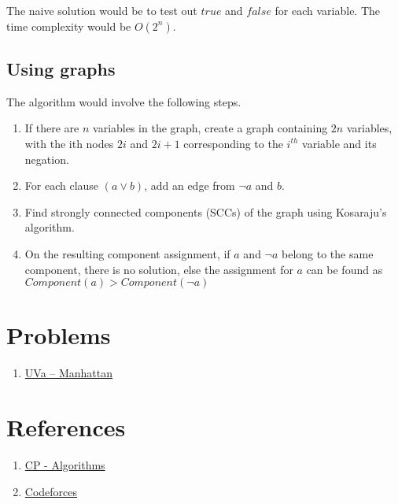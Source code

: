 \documentclass[titlepage, 12pt]{article}
\begin{document}
	The naive solution would be to test out $true$ and $false$ for each variable. The time complexity would be $ O(2^n) $.

	\subsection{Using graphs}

	The algorithm would involve the following steps.

	\begin{enumerate}

	\item If there are $n$ variables in the graph, create a graph containing $2n$ variables, with the ith nodes $2i$ and $2i+1$ corresponding to the $i^{th}$ variable and its negation.
	
	\item For each clause $(a \lor b)$, add an edge from $\lnot a$ and $b$.
	
	\item Find strongly connected components (SCCs) of the graph using Kosaraju's algorithm.
	
	\item On the resulting component assignment, if $a$ and $\lnot a$ belong to the same component, there is no solution, else the assignment for $a$ can be found as $Component(a) > Component(\lnot a)$
	
	\end{enumerate}
			
	\section{Problems}
	
	\begin{enumerate}
	
	\item \href{https://onlinejudge.org/index.php?option=onlinejudge&page=show_problem&problem=1260}{UVa -- Manhattan}
	
	\end{enumerate}
	
	\section{References}
	
	\begin{enumerate}
	
	\item \href{https://cp-algorithms.com/graph/2SAT.html}{CP - Algorithms}
	
	\item \href{https://codeforces.com/blog/entry/16205}{Codeforces}
	
	\end{enumerate}
	
\end{document}
